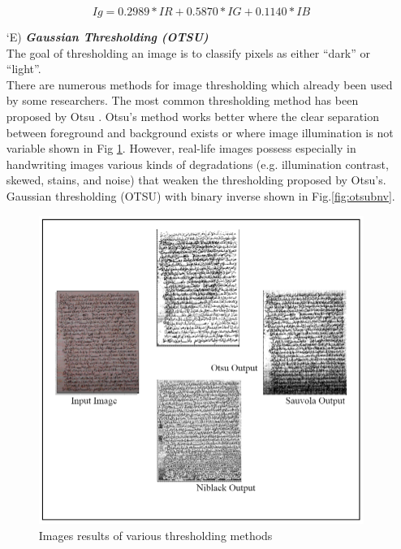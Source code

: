\begin{itemize}[labelindent=1em,labelsep=0.25cm,leftmargin=*]
        \begin{equation}
            Ig = 0.2989 * IR + 0.5870 * IG + 0.1140 * IB
            \label{equ:gray}
        \end{equation}
        \item[\char `E)] \textit{\textbf{Gaussian Thresholding (OTSU)}}\\
        The goal of thresholding \cite{thresholding} an image is to classify pixels as either “dark” or “light”.\\
        There are numerous methods for image thresholding which already been used by some researchers. The most common thresholding method has been proposed by Otsu . Otsu’s method works better where the clear separation between foreground and background exists or where image illumination is not variable shown in Fig \ref{fig:otsu}. However, real-life images possess especially in handwriting images various kinds of degradations (e.g. illumination contrast, skewed, stains, and noise) that weaken the thresholding proposed by Otsu’s. Gaussian thresholding (OTSU) with binary inverse shown in Fig.\ref{fig:otsubnv}.
        \begin{figure}[!htb]
            \centering
            \includegraphics[width=11cm]{images/otsu.png}
            \caption{Images results of various thresholding methods}
            \label{fig:otsu}
        \end{figure}
        

\end{itemize}
